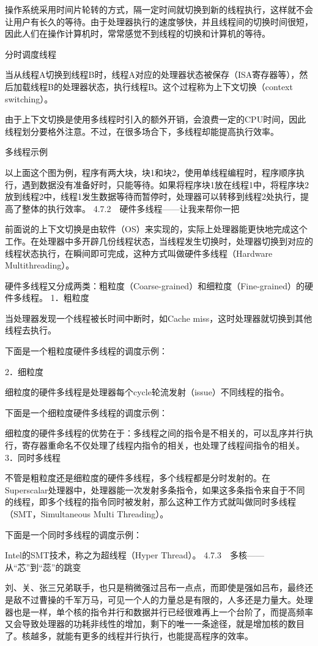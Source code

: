 \documentclass[12pt,UTF8]{ctexbook}
\begin{document}
操作系统采用时间片轮转的方式，隔一定时间就切换到新的线程执行，这样就不会让用户有长久的等待。由于处理器执行的速度够快，并且线程间的切换时间很短，因此人们在操作计算机时，常常感觉不到线程的切换和计算机的等待。

分时调度线程

当从线程A切换到线程B时，线程A对应的处理器状态被保存（ISA寄存器等），然后加载线程B的处理器状态，执行线程B。这个过程称为上下文切换（context switching）。

由于上下文切换是使用多线程时引入的额外开销，会浪费一定的CPU时间，因此线程划分要格外注意。不过，在很多场合下，多线程却能提高执行效率。

多线程示例

以上面这个图为例，程序有两大块，块1和块2，使用单线程编程时，程序顺序执行，遇到数据没有准备好时，只能等待。如果将程序块1放在线程1中，将程序块2放到线程2中，线程1发生数据等待而暂停时，处理器可以转移到线程2处执行，提高了整体的执行效率。
4.7.2　硬件多线程——让我来帮你一把

前面说的上下文切换是由软件（OS）来实现的，实际上处理器能更快地完成这个工作。在处理器中多开辟几份线程状态，当线程发生切换时，处理器切换到对应的线程状态执行，在瞬间即可完成，这种方式叫做硬件多线程（Hardware Multithreading）。

硬件多线程又分成两类：粗粒度（Coarse-grained）和细粒度（Fine-grained）的硬件多线程。
1．粗粒度

当处理器发现一个线程被长时间中断时，如Cache miss，这时处理器就切换到其他线程去执行。

下面是一个粗粒度硬件多线程的调度示例：

2．细粒度

细粒度的硬件多线程是处理器每个cycle轮流发射（issue）不同线程的指令。

下面是一个细粒度硬件多线程的调度示例：

细粒度的硬件多线程的优势在于：多线程之间的指令是不相关的，可以乱序并行执行，寄存器重命名不仅处理了线程内指令的相关，也处理了线程间指令的相关。
3．同时多线程

不管是粗粒度还是细粒度的硬件多线程，多个线程都是分时发射的。在Superscalar处理器中，处理器能一次发射多条指令，如果这多条指令来自于不同的线程，即多个线程的指令同时被发射，那么这种工作方式就叫做同时多线程（SMT，Simultaneous Multi Threading）。

下面是一个同时多线程的调度示例：

Intel的SMT技术，称之为超线程（Hyper Thread）。
4.7.3　多核——从“芯”到“蕊”的跳变

刘、关、张三兄弟联手，也只是稍微强过吕布一点点，而即使是强如吕布，最终还是敌不过曹操的千军万马，可见一个人的力量总是有限的，人多还是力量大。处理器也是一样，单个核的指令并行和数据并行已经很难再上一个台阶了，而提高频率又会导致处理器的功耗非线性的增加，剩下的唯一一条途径，就是增加核的数目了。核越多，就能有更多的线程并行执行，也能提高程序的效率。
\end{document}
